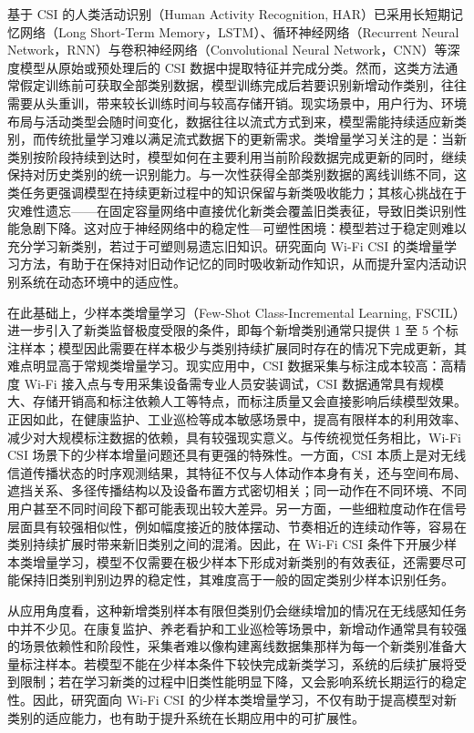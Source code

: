 基于 CSI 的人类活动识别（Human Activity Recognition, HAR）已采用长短期记忆网络（Long Short-Term Memory，LSTM）、循环神经网络（Recurrent Neural Network，RNN）与卷积神经网络（Convolutional Neural Network，CNN）等深度模型从原始或预处理后的 CSI 数据中提取特征并完成分类\cite{ma2019wifi}。然而，这类方法通常假定训练前可获取全部类别数据，模型训练完成后若要识别新增动作类别，往往需要从头重训，带来较长训练时间与较高存储开销。现实场景中，用户行为、环境布局与活动类型会随时间变化，数据往往以流式方式到来，模型需能持续适应新类别，而传统批量学习难以满足流式数据下的更新需求。类增量学习关注的是：当新类别按阶段持续到达时，模型如何在主要利用当前阶段数据完成更新的同时，继续保持对历史类别的统一识别能力。与一次性获得全部类别数据的离线训练不同，这类任务更强调模型在持续更新过程中的知识保留与新类吸收能力；其核心挑战在于灾难性遗忘——在固定容量网络中直接优化新类会覆盖旧类表征，导致旧类识别性能急剧下降\cite{zhou2024cil}。这对应于神经网络中的稳定性—可塑性困境：模型若过于稳定则难以充分学习新类别，若过于可塑则易遗忘旧知识。研究面向 Wi-Fi CSI 的类增量学习方法，有助于在保持对旧动作记忆的同时吸收新动作知识，从而提升室内活动识别系统在动态环境中的适应性。

在此基础上，少样本类增量学习（Few-Shot Class-Incremental Learning, FSCIL）进一步引入了新类监督极度受限的条件，即每个新增类别通常只提供 1 至 5 个标注样本；模型因此需要在样本极少与类别持续扩展同时存在的情况下完成更新，其难点明显高于常规类增量学习\cite{tian2024fscilsurvey}。现实应用中，CSI 数据采集与标注成本较高：高精度 Wi-Fi 接入点与专用采集设备需专业人员安装调试，CSI 数据通常具有规模大、存储开销高和标注依赖人工等特点，而标注质量又会直接影响后续模型效果。正因如此，在健康监护、工业巡检等成本敏感场景中，提高有限样本的利用效率、减少对大规模标注数据的依赖，具有较强现实意义。与传统视觉任务相比，Wi-Fi CSI 场景下的少样本增量问题还具有更强的特殊性。一方面，CSI 本质上是对无线信道传播状态的时序观测结果，其特征不仅与人体动作本身有关，还与空间布局、遮挡关系、多径传播结构以及设备布置方式密切相关；同一动作在不同环境、不同用户甚至不同时间段下都可能表现出较大差异。另一方面，一些细粒度动作在信号层面具有较强相似性，例如幅度接近的肢体摆动、节奏相近的连续动作等，容易在类别持续扩展时带来新旧类别之间的混淆。因此，在 Wi-Fi CSI 条件下开展少样本类增量学习，模型不仅需要在极少样本下形成对新类别的有效表征，还需要尽可能保持旧类别判别边界的稳定性，其难度高于一般的固定类别少样本识别任务。

从应用角度看，这种新增类别样本有限但类别仍会继续增加的情况在无线感知任务中并不少见。在康复监护、养老看护和工业巡检等场景中，新增动作通常具有较强的场景依赖性和阶段性，采集者难以像构建离线数据集那样为每一个新类别准备大量标注样本。若模型不能在少样本条件下较快完成新类学习，系统的后续扩展将受到限制；若在学习新类的过程中旧类性能明显下降，又会影响系统长期运行的稳定性。因此，研究面向 Wi-Fi CSI 的少样本类增量学习，不仅有助于提高模型对新类别的适应能力，也有助于提升系统在长期应用中的可扩展性。

